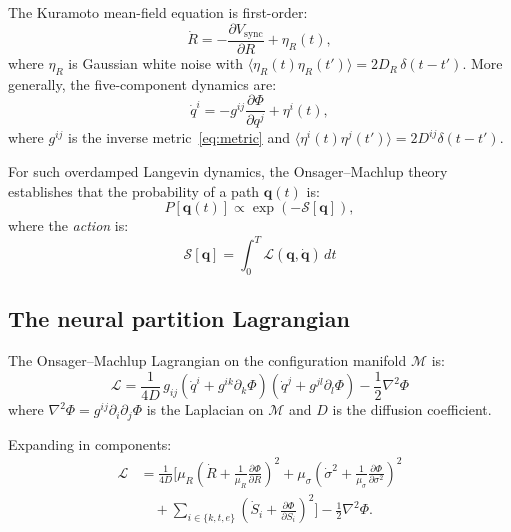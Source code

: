 \documentclass[twocolumn,aps,prl,superscriptaddress,floatfix]{revtex4-2}
\newcommand{\Lag}{\mathcal{L}}
\newcommand{\Action}{\mathcal{S}}
\newcommand{\Pot}{\Phi}
\newcommand{\qvec}{\mathbf{q}}
\begin{document}
The Kuramoto mean-field equation is first-order:
\begin{equation}
\dot{R} = -\frac{\partial V_{\mathrm{sync}}}{\partial R} + \eta_R(t),
\end{equation}
where $\eta_R$ is Gaussian white noise with $\langle \eta_R(t)\eta_R(t')\rangle = 2D_R\,\delta(t - t')$.
More generally, the five-component dynamics are:
\begin{equation}
\dot{q}^i = -g^{ij}\frac{\partial \Pot}{\partial q^j} + \eta^i(t),
\label{eq:langevin}
\end{equation}
where $g^{ij}$ is the inverse metric~\eqref{eq:metric} and $\langle \eta^i(t)\eta^j(t')\rangle = 2D^{ij}\delta(t-t')$.

For such overdamped Langevin dynamics, the Onsager--Machlup theory~\cite{onsager1953,machlup1953} establishes that the probability of a path $\qvec(t)$ is:
\begin{equation}
P[\qvec(t)] \propto \exp\!\left(-\Action[\qvec]\right),
\end{equation}
where the \emph{action} is:
\begin{equation}
\boxed{
\Action[\qvec] = \int_0^T \Lag(\qvec, \dot{\qvec})\,dt
}
\label{eq:action}
\end{equation}

\subsection{The neural partition Lagrangian}

The Onsager--Machlup Lagrangian on the configuration manifold $\mathcal{M}$ is:
\begin{equation}
\boxed{
\Lag = \frac{1}{4D}\,g_{ij}\!\left(\dot{q}^i + g^{ik}\partial_k\Pot\right)\!\left(\dot{q}^j + g^{jl}\partial_l\Pot\right) - \frac{1}{2}\nabla^2\Pot
}
\label{eq:lagrangian}
\end{equation}
where $\nabla^2\Pot = g^{ij}\partial_i\partial_j\Pot$ is the Laplacian on $\mathcal{M}$ and $D$ is the diffusion coefficient.

Expanding in components:
\begin{align}
\Lag &= \frac{1}{4D}\Bigg[\mu_R\!\left(\dot{R} + \frac{1}{\mu_R}\frac{\partial\Pot}{\partial R}\right)^{\!2} + \mu_\sigma\!\left(\dot{\sigma}^2 + \frac{1}{\mu_\sigma}\frac{\partial\Pot}{\partial\sigma^2}\right)^{\!2} \nonumber\\
&\quad + \sum_{i \in \{k,t,e\}}\left(\dot{S}_i + \frac{\partial\Pot}{\partial S_i}\right)^{\!2}\Bigg] - \frac{1}{2}\nabla^2\Pot.
\label{eq:lagrangian_expanded}
\end{align}
\end{document}

